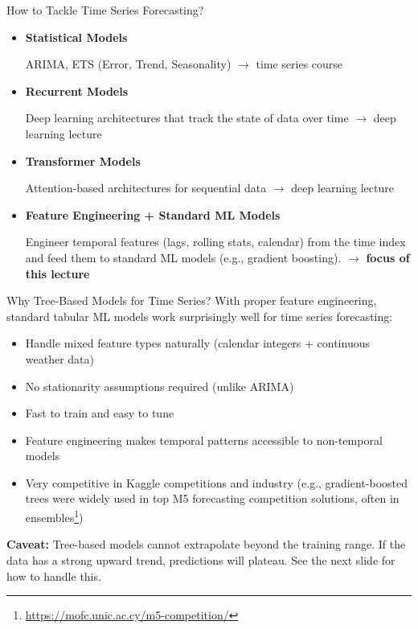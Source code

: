 \documentclass[11pt,compress,t,notes=noshow, xcolor=table]{beamer}
\begin{document}
\begin{vbframe}{How to Tackle Time Series Forecasting?}
\vfill
    \begin{itemize}
        \item \textbf{Statistical Models}

        ARIMA, ETS (Error, Trend, Seasonality) $\rightarrow$ time series course

        \item \textbf{Recurrent Models}

        Deep learning architectures that track the state of data over time $\rightarrow$ deep learning lecture

        \item \textbf{Transformer Models}

        Attention-based architectures for sequential data $\rightarrow$ deep learning lecture

        \item \textbf{Feature Engineering + Standard ML Models}

        Engineer temporal features (lags, rolling stats, calendar) from the time index and feed them to standard ML models (e.g., gradient boosting). $\rightarrow$ \textbf{focus of this lecture}
    \end{itemize}
\vfill
\end{vbframe}

\begin{vbframe}{Why Tree-Based Models for Time Series?}
\vfill
With proper feature engineering, standard tabular ML models work surprisingly well for time series forecasting:
\vfill
\begin{itemize}
    \item Handle mixed feature types naturally (calendar integers + continuous weather data)
    \item No stationarity assumptions required (unlike ARIMA)
    \item Fast to train and easy to tune
    \item Feature engineering makes temporal patterns accessible to non-temporal models
    \item Very competitive in Kaggle competitions and industry (e.g., gradient-boosted trees were widely used in top M5 forecasting competition solutions, often in ensembles\footnote{\tiny\url{https://mofc.unic.ac.cy/m5-competition/}})
\end{itemize}
\vfill
\textbf{Caveat:} Tree-based models cannot extrapolate beyond the training range. If the data has a strong upward trend, predictions will plateau. See the next slide for how to handle this.
\vfill
\end{vbframe}
\end{document}
